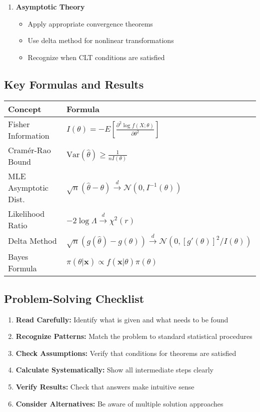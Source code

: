 \documentclass[12pt,a4paper]{article}
\theoremstyle{remark}
\begin{document}
\begin{enumerate}
\item \textbf{Asymptotic Theory}
   \begin{itemize}
   \item Apply appropriate convergence theorems
   \item Use delta method for nonlinear transformations
   \item Recognize when CLT conditions are satisfied
   \end{itemize}
\end{enumerate}

\subsection{Key Formulas and Results}

\begin{table}[h]
\centering
\begin{tabular}{|l|l|}
\hline
\textbf{Concept} & \textbf{Formula} \\
\hline
Fisher Information & $I(\theta) = -E\left[\frac{\partial^2 \log f(X;\theta)}{\partial \theta^2}\right]$ \\
\hline
Cramér-Rao Bound & $\text{Var}(\hat{\theta}) \geq \frac{1}{nI(\theta)}$ \\
\hline
MLE Asymptotic Dist. & $\sqrt{n}(\hat{\theta} - \theta) \stackrel{d}{\to} \mathcal{N}(0, I^{-1}(\theta))$ \\
\hline
Likelihood Ratio & $-2\log\Lambda \stackrel{d}{\to} \chi^2(r)$ \\
\hline
Delta Method & $\sqrt{n}(g(\hat{\theta}) - g(\theta)) \stackrel{d}{\to} \mathcal{N}(0, [g'(\theta)]^2/I(\theta))$ \\
\hline
Bayes Formula & $\pi(\theta|\mathbf{x}) \propto f(\mathbf{x}|\theta)\pi(\theta)$ \\
\hline
\end{tabular}
\end{table}

\subsection{Problem-Solving Checklist}

\begin{enumerate}
\item \textbf{Read Carefully:} Identify what is given and what needs to be found
\item \textbf{Recognize Patterns:} Match the problem to standard statistical procedures
\item \textbf{Check Assumptions:} Verify that conditions for theorems are satisfied
\item \textbf{Calculate Systematically:} Show all intermediate steps clearly
\item \textbf{Verify Results:} Check that answers make intuitive sense
\item \textbf{Consider Alternatives:} Be aware of multiple solution approaches
\end{enumerate}
\end{document}
